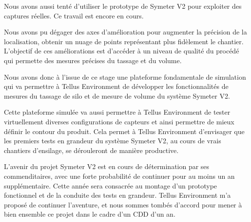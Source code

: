 \documentclass[12pt,a4paper]{report}
\begin{document}
\para Nous avons aussi tenté d'utiliser le prototype de Symeter V2 pour exploiter des captures réelles. Ce travail est encore en cours.

\para Nous avons pu dégager des axes d'amélioration pour augmenter la précision de la localisation, obtenir un nuage de points représentant plus fidèlement le chantier. L'objectif de ces améliorations est d'accéder à un niveau de qualité du procédé qui permette des mesures précises du tassage et du volume.

\para Nous avons donc à l'issue de ce stage une plateforme fondamentale de simulation qui va permettre à Tellus Environment de développer les fonctionnalités de mesures du tassage de silo et de mesure de volume du système Symeter V2. 

\para Cette plateforme simulée va aussi permettre à Tellus Environment de tester virtuellement diverses configurations de capteurs et ainsi permettre de mieux définir le contour du produit. Cela permet à Tellus Environment d'envisager que les premiers tests en grandeur du système Symeter V2, au cours de vrais chantiers d'ensilage, se dérouleront de manière productive.

\para L'avenir du projet Symeter V2 est en cours de détermination par ses commenditaires, avec une forte probabilité de continuer pour au moins un an supplémentaire. Cette année sera consacrée au montage d'un prototype fonctionnel et de la conduite des tests en grandeur. Tellus Environment m'a proposé de continuer l'aventure, et nous sommes tombés d'accord pour mener à bien ensemble ce projet dans le cadre d'un CDD d'un an.
\end{document}
